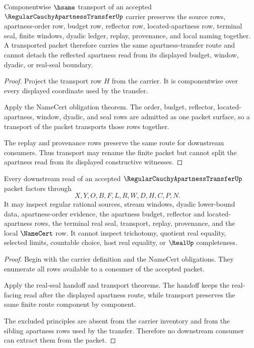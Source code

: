 \begin{theorem}
\label{thm:regular-cauchy-apartness-transfer-transport}
Componentwise $\hsame$ transport of an accepted $\RegularCauchyApartnessTransferUp$ carrier preserves the source rows, apartness-order row, budget row, reflector row, located-apartness row, terminal seal, finite windows, dyadic ledger, replay, provenance, and local naming together. A transported packet therefore carries the same apartness-transfer route and cannot detach the reflected apartness read from its displayed budget, window, dyadic, or real-seal boundary.
\end{theorem}
\begin{proof}
Project the transport row $H$ from the carrier. It is componentwise over every displayed coordinate used by the transfer.

Apply the NameCert obligation theorem. The order, budget, reflector, located-apartness, window, dyadic, and seal rows are admitted as one packet surface, so a transport of the packet transports those rows together.

The replay and provenance rows preserve the same route for downstream consumers. Thus transport may rename the finite packet but cannot split the apartness read from its displayed constructive witnesses.
\end{proof}

\begin{theorem}
\label{thm:regular-cauchy-apartness-transfer-nonescape}
Every downstream read of an accepted $\RegularCauchyApartnessTransferUp$ packet factors through
$$
X,Y,O,B,F,L,R,W,D,H,C,P,N .
$$
It may inspect regular rational sources, stream windows, dyadic lower-bound data, apartness-order evidence, the apartness budget, reflector and located-apartness rows, the terminal real seal, transport, replay, provenance, and the local $\NameCert$ row. It cannot inspect trichotomy, quotient real equality, selected limits, countable choice, host real equality, or $\RealUp$ completeness.
\end{theorem}
\begin{proof}
Begin with the carrier definition and the NameCert obligations. They enumerate all rows available to a consumer of the accepted packet.

Apply the real-seal handoff and transport theorems. The handoff keeps the real-facing read after the displayed apartness route, while transport preserves the same finite route component by component.

The excluded principles are absent from the carrier inventory and from the sibling apartness rows used by the transfer. Therefore no downstream consumer can extract them from the packet.
\end{proof}

